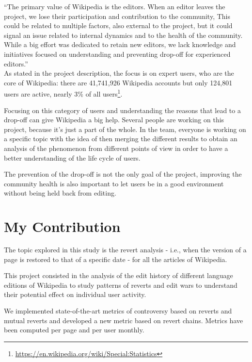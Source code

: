 “The primary value of Wikipedia is the editors. When an editor leaves the project, we lose their
participation and contribution to the community, This could be related to multiple factors, also
external to the project, but it could signal an issue related to internal dynamics and to the health
of the community. While a big effort was dedicated to retain new editors, we lack knowledge and
initiatives focused on understanding and preventing drop-off for experienced editors.”
\\

As stated in the project description, the focus is on expert users, who are the core of Wikipedia:
there are 41,741,926 Wikipedia accounts but only 124,801 users are active, nearly 3\% of all
users\footnote{\url{https://en.wikipedia.org/wiki/Special:Statistics}}. 

Focusing on this category of users and understanding the reasons that lead to a drop-off can give Wikipedia a
big help. Several people are working on this project, because it's just a part of the whole.
In the team, everyone is working on a specific topic with the idea of then merging the different
results to obtain an analysis of the phenomenon from different points of view in order to have a
better understanding of the life cycle of users.  

The prevention of the drop-off is not the only goal of the project, improving the community health
is also important to let users be in a good environment without being held back from editing. 

\section{My Contribution}
\label{sec:project}
The topic explored in this study is the revert analysis - i.e., when the version of a page is
restored to that of a specific date - for all the articles of Wikipedia.

This project consisted in the analysis of the edit history of different language editions of
Wikipedia to study patterns of reverts and edit wars to understand their potential effect on
individual user activity.

We implemented state-of-the-art metrics of controversy based on reverts and mutual reverts and
developed a new metric based on revert chains. Metrics have been computed per page and per user
monthly.



